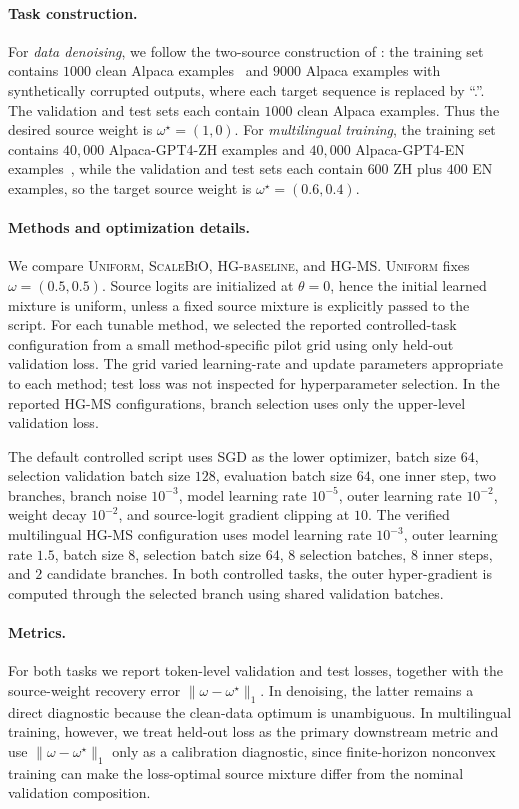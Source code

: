 \documentclass{article}
\theoremstyle{normaltheorem}
\begin{document}
\paragraph{Task construction.}
For \emph{data denoising}, we follow the two-source construction of \citet{pan2025scalebio}: the training set contains $1000$ clean Alpaca examples~\citep{taori2023alpaca} and $9000$ Alpaca examples with synthetically corrupted outputs, where each target sequence is replaced by ``.''. The validation and test sets each contain $1000$ clean Alpaca examples. Thus the desired source weight is $\omega^\star=(1,0)$. For \emph{multilingual training}, the training set contains $40{,}000$ Alpaca-GPT4-ZH examples and $40{,}000$ Alpaca-GPT4-EN examples~\citep{peng2023instruction}, while the validation and test sets each contain $600$ ZH plus $400$ EN examples, so the target source weight is $\omega^\star=(0.6,0.4)$.
\paragraph{Methods and optimization details.}
We compare \textsc{Uniform}, \textsc{ScaleBiO}, \textsc{HG-baseline}, and \textsc{HG-MS}. \textsc{Uniform} fixes
\(\omega=(0.5,0.5)\). Source logits are initialized at \(\theta=0\), hence the initial learned mixture is uniform, unless
a fixed source mixture is explicitly passed to the script. For each tunable method, we selected the reported
controlled-task configuration from a small method-specific pilot grid using only held-out validation loss. The grid varied
learning-rate and update parameters appropriate to each method; test loss was not inspected for hyperparameter selection.
In the reported \textsc{HG-MS} configurations, branch selection uses only the upper-level validation loss.

The default controlled script uses SGD as the lower optimizer, batch size \(64\), selection validation batch size \(128\),
evaluation batch size \(64\), one inner step, two branches, branch noise \(10^{-3}\), model learning rate \(10^{-5}\),
outer learning rate \(10^{-2}\), weight decay \(10^{-2}\), and source-logit gradient clipping at \(10\). The verified
multilingual \textsc{HG-MS} configuration uses model learning rate \(10^{-3}\), outer learning rate \(1.5\), batch
size \(8\), selection batch size \(64\), \(8\) selection batches, \(8\) inner steps, and \(2\) candidate branches. In both
controlled tasks, the outer hyper-gradient is computed through the selected branch using shared validation batches.
\paragraph{Metrics.}
For both tasks we report token-level validation and test losses, together with the source-weight recovery error $\|\omega-\omega^\star\|_1$. In denoising, the latter remains a direct diagnostic because the clean-data optimum is unambiguous. In multilingual training, however, we treat held-out loss as the primary downstream metric and use $\|\omega-\omega^\star\|_1$ only as a calibration diagnostic, since finite-horizon nonconvex training can make the loss-optimal source mixture differ from the nominal validation composition.
\end{document}
